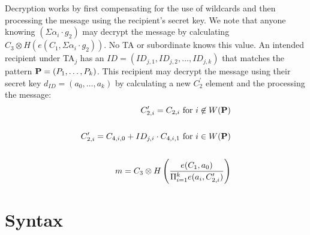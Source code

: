 \documentclass[10pt]{article}
\begin{document}
Decryption works by first compensating for the use of wildcards and then processing the message using the recipient's secret key. We note that anyone knowing $(\Sigma \alpha_i \cdot g_2)$ may decrypt the message by calculating $C_3 \otimes H (e(C_1, \Sigma \alpha_i \cdot g_2))$. No TA or subordinate knows this value. An intended recipient under TA$_j$ has an $ID = (ID_{j,1}, ID_{j,2}, \dots, ID_{j,k})$ that matches the pattern ${\bf P} = (P_1,
\dots, P_k)$. This recipient may decrypt the message using their secret key $d_{ID} = (a_0, \dots, a_k)$ by calculating a new $C_2^{\prime}$
element and the processing the message:
\begin{align*}
C_{2,i}^{\prime} = C_{2,i}\text{ for }i \not\in W({\bf P})\\
\\
C_{2,i}^{\prime} = C_{4,i,0} + ID_{j,i} \cdot C_{4,i,1}\text{ for }i \in W({\bf P})\\
\\
m = C_3 \otimes H\left(\frac{e(C_1, a_0)}{\Pi_{i=1}^k e(a_i, C_{2,i}^{\prime})}\right)
\end{align*}

\section{Syntax}
\end{document}
